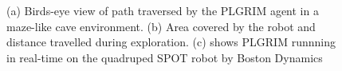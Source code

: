 \documentclass[letterpaper]{article} %
\begin{document}
\begin{figure}[t!]
{    \label{fig:spot-garden}
  }
  \caption{(a) Birds-eye view of path traversed by the PLGRIM agent in a maze-like cave environment. (b) Area covered by the robot and distance travelled during exploration. (c) shows PLGRIM runnning in real-time on the quadruped SPOT robot by Boston Dynamics}
\end{figure}


% 	    
% 	    	
%
\end{document}
